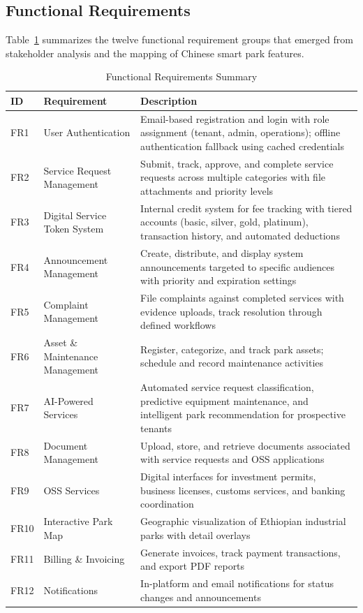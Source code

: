 \subsection{Functional Requirements}

Table~\ref{tab:func-req} summarizes the twelve functional requirement groups that emerged from stakeholder analysis and the mapping of Chinese smart park features.

\begin{table}[H]
\centering
\caption{Functional Requirements Summary}
\label{tab:func-req}
\small
\begin{tabular}{lp{3.5cm}p{7.5cm}}
\toprule
\textbf{ID} & \textbf{Requirement} & \textbf{Description} \\
\midrule
FR1 & User Authentication & Email-based registration and login with role assignment (tenant, admin, operations); offline authentication fallback using cached credentials \\
FR2 & Service Request Management & Submit, track, approve, and complete service requests across multiple categories with file attachments and priority levels \\
FR3 & Digital Service Token System & Internal credit system for fee tracking with tiered accounts (basic, silver, gold, platinum), transaction history, and automated deductions \\
FR4 & Announcement Management & Create, distribute, and display system announcements targeted to specific audiences with priority and expiration settings \\
FR5 & Complaint Management & File complaints against completed services with evidence uploads, track resolution through defined workflows \\
FR6 & Asset \& Maintenance Management & Register, categorize, and track park assets; schedule and record maintenance activities \\
FR7 & AI-Powered Services & Automated service request classification, predictive equipment maintenance, and intelligent park recommendation for prospective tenants \\
FR8 & Document Management & Upload, store, and retrieve documents associated with service requests and OSS applications \\
FR9 & OSS Services & Digital interfaces for investment permits, business licenses, customs services, and banking coordination \\
FR10 & Interactive Park Map & Geographic visualization of Ethiopian industrial parks with detail overlays \\
FR11 & Billing \& Invoicing & Generate invoices, track payment transactions, and export PDF reports \\
FR12 & Notifications & In-platform and email notifications for status changes and announcements \\
\bottomrule
\end{tabular}
\end{table}

